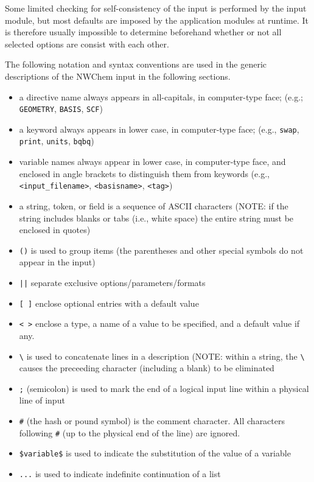 Some limited checking for self-consistency of the input is performed
by the input module, but most defaults are imposed by the application
modules at runtime.  It is therefore usually impossible to determine
beforehand whether or not all selected options are consist with each
other.

The following notation and syntax conventions are used in the generic 
descriptions of the NWChem input in the following sections.

\begin{itemize}
\item a directive name always appears in all-capitals, in computer-type 
face; (e.g.; \verb+GEOMETRY+, \verb+BASIS+, \verb+SCF+)
\item a keyword always appears in lower case, in computer-type face; (e.g.,
{\tt swap}, {\tt print}, {\tt units}, {\tt bqbq})
\item variable names always appear in lower case, in computer-type face, 
and enclosed in angle brackets to distinguish them from keywords (e.g.,
{\tt <input\_filename>}, {\tt <basisname>}, {\tt <tag>})
\item a string, token, or field is a sequence of ASCII characters (NOTE: if 
the string includes blanks or tabs (i.e., white space) the entire string must
be enclosed in quotes)
\item \verb+()+ is used to group items (the parentheses and other
      special symbols do not appear in the input)
\item \verb+||+ separate exclusive options/parameters/formats
\item \verb+[ ]+ enclose optional entries with a default value
\item \verb+< >+ enclose a type, a name of a value to be specified,
      and a default value if any.

\item \verb+\+ is used to concatenate lines in a description (NOTE: within 
a string, the \verb+\+ causes the preceeding character (including a blank) 
to be eliminated
\item \verb+;+ (semicolon) is used to mark the end of a logical input 
line within a physical line of input
\item \verb+#+ (the hash or pound symbol) is the comment character.  All
characters following \verb+#+ (up to the physical end of the line) are ignored.

\item \verb+$variable$+ is used to indicate the substitution of the value of a
      variable
\item \verb+...+ is used to indicate indefinite continuation of a list
\end{itemize}

